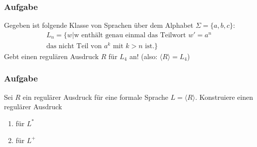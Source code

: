 \begin{frame}
  \frametitle{Aufgabe}
  Gegeben ist folgende Klasse von Sprachen über dem Alphabet $\Sigma = \{a,b,c\}$:
  \begin{multline*}
    L_n = \{w|
      \text{w enthält genau einmal das Teilwort $w'=a^n$}\\
      \text{das nicht Teil von $a^k$ mit $k > n$ ist.}
          \}
  \end{multline*}
  Gebt einen regulären Ausdruck $R$ für $L_4$ an! (also: $\langle R \rangle = L_4$)\\
  \hfill
\end{frame}

\begin{frame}
  \frametitle{Aufgabe}
	\begin{exampleblock}{}
		Sei $R$ ein regulärer Ausdruck für eine formale Sprache $L=\langle R \rangle$. Konstruiere einen regulärer Ausdruck
  		\begin{enumerate}
        \item für $L^*$ \\
        \item für $L^+$ \\
  		\end{enumerate}
	\end{exampleblock}
\end{frame}

